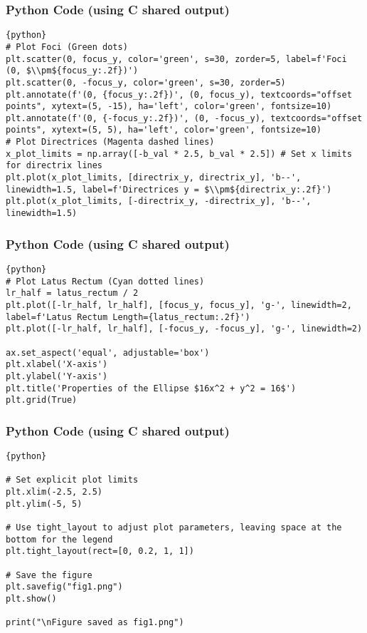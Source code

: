 \documentclass{beamer}
\begin{document}
\begin{frame}[fragile]
\frametitle{Python Code (using C shared output)}
\begin{lstlisting}{python}
# Plot Foci (Green dots)
plt.scatter(0, focus_y, color='green', s=30, zorder=5, label=f'Foci (0, $\\pm${focus_y:.2f})')
plt.scatter(0, -focus_y, color='green', s=30, zorder=5)
plt.annotate(f'(0, {focus_y:.2f})', (0, focus_y), textcoords="offset points", xytext=(5, -15), ha='left', color='green', fontsize=10)
plt.annotate(f'(0, {-focus_y:.2f})', (0, -focus_y), textcoords="offset points", xytext=(5, 5), ha='left', color='green', fontsize=10)
# Plot Directrices (Magenta dashed lines)
x_plot_limits = np.array([-b_val * 2.5, b_val * 2.5]) # Set x limits for directrix lines
plt.plot(x_plot_limits, [directrix_y, directrix_y], 'b--', linewidth=1.5, label=f'Directrices y = $\\pm${directrix_y:.2f}')
plt.plot(x_plot_limits, [-directrix_y, -directrix_y], 'b--', linewidth=1.5)
\end{lstlisting}
\end{frame}

\begin{frame}[fragile]
\frametitle{Python Code (using C shared output)}
\begin{lstlisting}{python}
# Plot Latus Rectum (Cyan dotted lines)
lr_half = latus_rectum / 2
plt.plot([-lr_half, lr_half], [focus_y, focus_y], 'g-', linewidth=2, label=f'Latus Rectum Length={latus_rectum:.2f}')
plt.plot([-lr_half, lr_half], [-focus_y, -focus_y], 'g-', linewidth=2)

ax.set_aspect('equal', adjustable='box')
plt.xlabel('X-axis')
plt.ylabel('Y-axis')
plt.title('Properties of the Ellipse $16x^2 + y^2 = 16$')
plt.grid(True)
\end{lstlisting}
\end{frame}

\begin{frame}[fragile]
\frametitle{Python Code (using C shared output)}
\begin{lstlisting}{python}

# Set explicit plot limits
plt.xlim(-2.5, 2.5)
plt.ylim(-5, 5)

# Use tight_layout to adjust plot parameters, leaving space at the bottom for the legend
plt.tight_layout(rect=[0, 0.2, 1, 1])

# Save the figure
plt.savefig("fig1.png")
plt.show()

print("\nFigure saved as fig1.png")
\end{lstlisting}
\end{frame}
\end{document}
